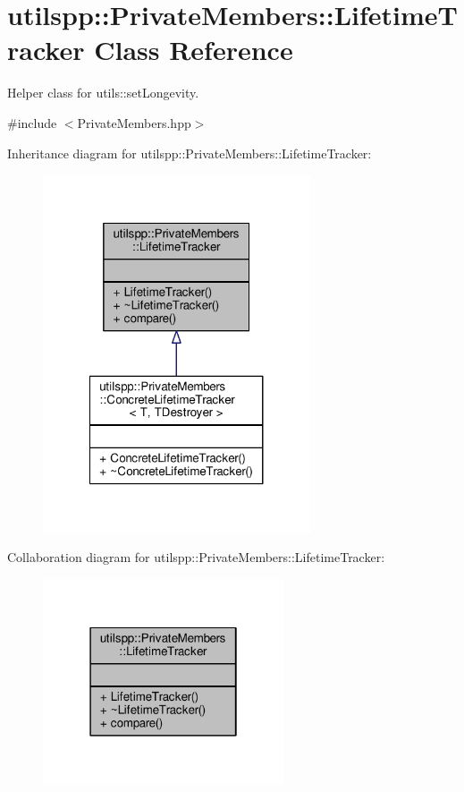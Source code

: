 \hypertarget{classutilspp_1_1PrivateMembers_1_1LifetimeTracker}{\section{utilspp\-:\-:Private\-Members\-:\-:Lifetime\-Tracker Class Reference}
\label{classutilspp_1_1PrivateMembers_1_1LifetimeTracker}
}


Helper class for utils\-::set\-Longevity.  




{\ttfamily \#include $<$Private\-Members.\-hpp$>$}



Inheritance diagram for utilspp\-:\-:Private\-Members\-:\-:Lifetime\-Tracker\-:\nopagebreak
\begin{figure}[H]
\begin{center}
\leavevmode
\includegraphics[width=224pt]{classutilspp_1_1PrivateMembers_1_1LifetimeTracker__inherit__graph}
\end{center}
\end{figure}


Collaboration diagram for utilspp\-:\-:Private\-Members\-:\-:Lifetime\-Tracker\-:\nopagebreak
\begin{figure}[H]
\begin{center}
\leavevmode
\includegraphics[width=202pt]{classutilspp_1_1PrivateMembers_1_1LifetimeTracker__coll__graph}
\end{center}
\end{figure}
